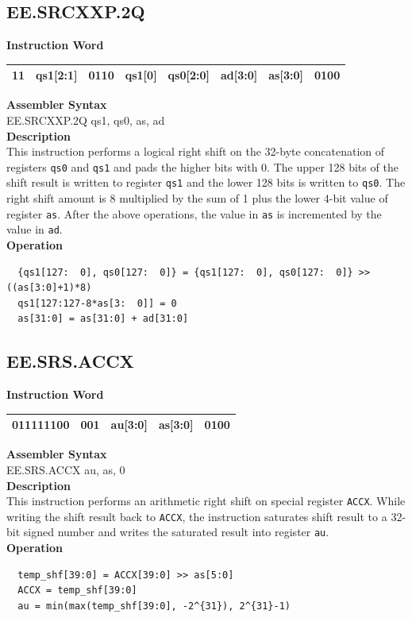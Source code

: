 \clearpage
\subsection{EE.SRCXXP.2Q}\label{instruction:EESRCXXP2Q}
\setlength\tabcolsep{6pt}
\textbf{Instruction Word} \\
\begin{tabular}{|c|c|c|c|c|c|c|c|}
	\hline
	11 & qs1[2:1] & 0110 & qs1[0] & qs0[2:0] & ad[3:0] & as[3:0] & 0100 \\
	\hline
\end{tabular}

\textbf{Assembler Syntax} \\
EE.SRCXXP.2Q qs1, qs0, as, ad \\
\textbf{Description} \\
This instruction performs a logical right shift on the 32-byte concatenation of registers \lstinline{qs0} and \lstinline{qs1} and pads the higher bits with 0. The upper 128 bits of the shift result is written to register \lstinline{qs1} and the lower 128 bits is written to \lstinline{qs0}. The right shift amount is 8 multiplied by the sum of 1 plus the lower 4-bit value of register \lstinline{as}. After the above operations, the value in \lstinline{as} is incremented by the value in \lstinline{ad}.\\
\textbf{Operation}
\begin{lstlisting}
  {qs1[127:  0], qs0[127:  0]} = {qs1[127:  0], qs0[127:  0]} >> ((as[3:0]+1)*8)
  qs1[127:127-8*as[3:  0]] = 0
  as[31:0] = as[31:0] + ad[31:0]
\end{lstlisting}

\clearpage
\subsection{EE.SRS.ACCX}\label{instruction:EESRSACCX}
\setlength\tabcolsep{6pt}
\textbf{Instruction Word} \\
\begin{tabular}{|c|c|c|c|c|}
	\hline
	011111100 & 001 & au[3:0] & as[3:0] & 0100 \\
	\hline
\end{tabular}

\textbf{Assembler Syntax} \\
EE.SRS.ACCX au, as, 0 \\
\textbf{Description} \\
This instruction performs an arithmetic right shift on special register \lstinline{ACCX}. While writing the shift result back to \lstinline{ACCX}, the instruction saturates shift result to a 32-bit signed number and writes the saturated result into register \lstinline{au}.\\
\textbf{Operation}
\begin{lstlisting}
  temp_shf[39:0] = ACCX[39:0] >> as[5:0]
  ACCX = temp_shf[39:0]
  au = min(max(temp_shf[39:0], -2^{31}), 2^{31}-1)
\end{lstlisting}

